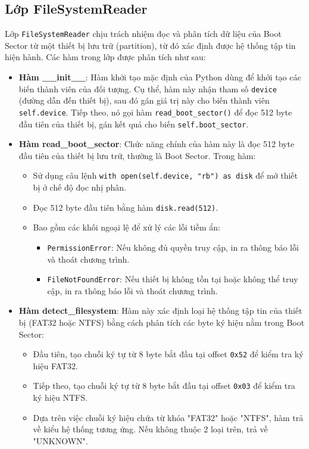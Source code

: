 \subsection{Lớp FileSystemReader}

Lớp \texttt{FileSystemReader} chịu trách nhiệm đọc và phân tích dữ liệu của Boot Sector từ một thiết bị lưu trữ (partition), từ đó xác định được hệ thống tập tin hiện hành. Các hàm trong lớp được phân tích như sau:

\begin{itemize}
    \item \textbf{Hàm \_\_init\_\_}: Hàm khởi tạo mặc định của Python dùng để khởi tạo các biến thành viên của đối tượng. Cụ thể, hàm này nhận tham số \texttt{device} (đường dẫn đến thiết bị), sau đó gán giá trị này cho biến thành viên \texttt{self.device}. Tiếp theo, nó gọi hàm \texttt{read\_boot\_sector()} để đọc 512 byte đầu tiên của thiết bị, gán kết quả cho biến \texttt{self.boot\_sector}.
    
    \item \textbf{Hàm read\_boot\_sector}: Chức năng chính của hàm này là đọc 512 byte đầu tiên của thiết bị lưu trữ, thường là Boot Sector. Trong hàm:
    \begin{itemize}
        \item Sử dụng câu lệnh \texttt{with open(self.device, "rb") as disk} để mở thiết bị ở chế độ đọc nhị phân.
        \item Đọc 512 byte đầu tiên bằng hàm \texttt{disk.read(512)}.
        \item Bao gồm các khối ngoại lệ để xử lý các lỗi tiềm ẩn:
        \begin{itemize}
            \item \texttt{PermissionError}: Nếu không đủ quyền truy cập, in ra thông báo lỗi và thoát chương trình.
            \item \texttt{FileNotFoundError}: Nếu thiết bị không tồn tại hoặc không thể truy cập, in ra thông báo lỗi và thoát chương trình.
        \end{itemize}
    \end{itemize}

    \item \textbf{Hàm detect\_filesystem}: Hàm này xác định loại hệ thống tập tin của thiết bị (FAT32 hoặc NTFS) bằng cách phân tích các byte ký hiệu nằm trong Boot Sector:
    \begin{itemize}
        \item Đầu tiên, tạo chuỗi ký tự từ 8 byte bắt đầu tại offset \texttt{0x52} để kiểm tra ký hiệu FAT32.
        \item Tiếp theo, tạo chuỗi ký tự từ 8 byte bắt đầu tại offset \texttt{0x03} để kiểm tra ký hiệu NTFS.
        \item Dựa trên việc chuỗi ký hiệu chứa từ khóa "FAT32" hoặc "NTFS", hàm trả về kiểu hệ thống tương ứng. Nếu không thuộc 2 loại trên, trả về "UNKNOWN".
    \end{itemize}


\end{itemize}
